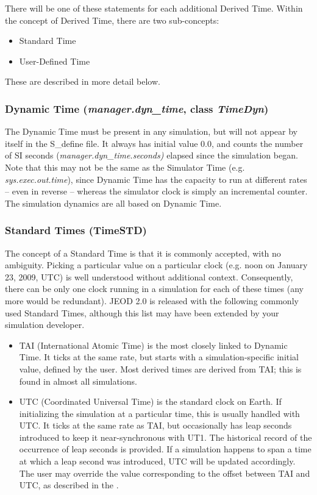 There will be one of these statements for each additional Derived Time.
Within the concept of Derived Time, there are two sub-concepts:


\begin{itemize}
\item Standard Time
\item User-Defined Time
\end{itemize}
These are described in more detail below.

\subsubsection{Dynamic Time (\textit{manager.dyn\_time}, class \textit{TimeDyn})}
The Dynamic Time must be present in any simulation, but will not
appear by itself in the S\_define file.  It always has initial value 0.0, and
counts the number of SI seconds (\textit{manager.dyn\_time.seconds) }elapsed
since the simulation began.  Note that this may not be the same as the
Simulator Time (e.g. \textit{sys.exec.out.time}), since
Dynamic Time has the capacity to run at different rates -- even
in reverse -- whereas the simulator clock is simply an incremental
counter.  The simulation dynamics are all based on Dynamic Time.

\subsubsection[Standard Times (class TimeSTD)]{Standard Times (TimeSTD)}
The concept of a Standard Time is that it is commonly accepted, with no
ambiguity.  Picking a particular value on a particular clock (e.g. noon
on January 23, 2009, UTC) is well understood without additional
context.  Consequently, there can be only one clock running in a
simulation for each of these times (any more would be redundant).
JEOD 2.0 is released with
the following commonly used Standard Times, although this list may have been
extended by your simulation developer.


\begin{itemize}
\item TAI (International Atomic Time) is the most closely linked to
Dynamic Time.  It ticks at the same rate, but starts with a simulation-specific
initial value, defined by the user.  Most derived times are derived
from TAI; this is found in almost all simulations.
\item UTC (Coordinated Universal Time) is the standard clock on Earth.
If initializing the simulation at a particular time, this is usually
handled with UTC.  It ticks at the same rate as TAI, but occasionally
has leap seconds introduced to keep it near-synchronous with UT1.  The
historical record of the occurrence of leap seconds is provided.  If a
simulation happens to span a time at which a leap second was
introduced, UTC will be updated accordingly.  The user may override the
value corresponding to the offset between TAI and UTC, as described in the .
\end{itemize}

